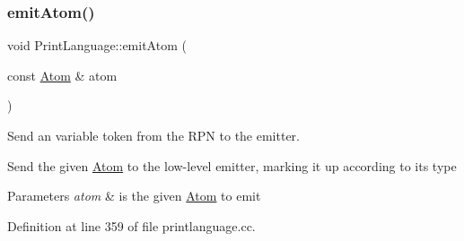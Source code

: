 \subsubsection{\texorpdfstring{emitAtom()}{emitAtom()}}
{\footnotesize\ttfamily void Print\+Language\+::emit\+Atom (\begin{DoxyParamCaption}\item[{const \mbox{\hyperlink{struct_print_language_1_1_atom}{Atom}} \&}]{atom }\end{DoxyParamCaption})\hspace{0.3cm}{\ttfamily [protected]}}



Send an variable token from the R\+PN to the emitter. 

Send the given \mbox{\hyperlink{struct_print_language_1_1_atom}{Atom}} to the low-\/level emitter, marking it up according to its type 
\begin{DoxyParams}{Parameters}
{\em atom} & is the given \mbox{\hyperlink{struct_print_language_1_1_atom}{Atom}} to emit \\
\hline
\end{DoxyParams}


Definition at line 359 of file printlanguage.\+cc.


